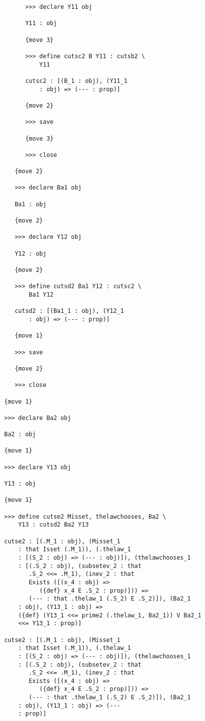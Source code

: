 \documentclass[12pt]{article}
\begin{document}
\begin{verbatim}
         >>> declare Y11 obj

         Y11 : obj

         {move 3}

         >>> define cutsc2 B Y11 : cutsb2 \
             Y11

         cutsc2 : [(B_1 : obj), (Y11_1 
             : obj) => (--- : prop)]

         {move 2}

         >>> save

         {move 3}

         >>> close

      {move 2}

      >>> declare Ba1 obj

      Ba1 : obj

      {move 2}

      >>> declare Y12 obj

      Y12 : obj

      {move 2}

      >>> define cutsd2 Ba1 Y12 : cutsc2 \
          Ba1 Y12

      cutsd2 : [(Ba1_1 : obj), (Y12_1 
          : obj) => (--- : prop)]

      {move 1}

      >>> save

      {move 2}

      >>> close

   {move 1}

   >>> declare Ba2 obj

   Ba2 : obj

   {move 1}

   >>> declare Y13 obj

   Y13 : obj

   {move 1}

   >>> define cutse2 Misset, thelawchooses, Ba2 \
       Y13 : cutsd2 Ba2 Y13

   cutse2 : [(.M_1 : obj), (Misset_1 
       : that Isset (.M_1)), (.thelaw_1 
       : [(S_2 : obj) => (--- : obj)]), (thelawchooses_1 
       : [(.S_2 : obj), (subsetev_2 : that 
          .S_2 <<= .M_1), (inev_2 : that 
          Exists ([(x_4 : obj) => 
             ({def} x_4 E .S_2 : prop)])) => 
          (--- : that .thelaw_1 (.S_2) E .S_2)]), (Ba2_1 
       : obj), (Y13_1 : obj) => 
       ({def} (Y13_1 <<= prime2 (.thelaw_1, Ba2_1)) V Ba2_1 
       <<= Y13_1 : prop)]

   cutse2 : [(.M_1 : obj), (Misset_1 
       : that Isset (.M_1)), (.thelaw_1 
       : [(S_2 : obj) => (--- : obj)]), (thelawchooses_1 
       : [(.S_2 : obj), (subsetev_2 : that 
          .S_2 <<= .M_1), (inev_2 : that 
          Exists ([(x_4 : obj) => 
             ({def} x_4 E .S_2 : prop)])) => 
          (--- : that .thelaw_1 (.S_2) E .S_2)]), (Ba2_1 
       : obj), (Y13_1 : obj) => (--- 
       : prop)]


\end{verbatim}
\end{document}

